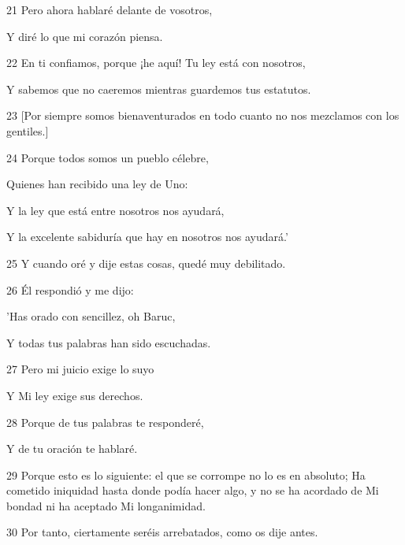\par 21 Pero ahora hablaré delante de vosotros,

\par Y diré lo que mi corazón piensa.

\par 22 En ti confiamos, porque ¡he aquí! Tu ley está con nosotros,

\par Y sabemos que no caeremos mientras guardemos tus estatutos.

\par 23 [Por siempre somos bienaventurados en todo cuanto no nos mezclamos con los gentiles.]

\par 24 Porque todos somos un pueblo célebre,

\par Quienes han recibido una ley de Uno:

\par Y la ley que está entre nosotros nos ayudará,

\par Y la excelente sabiduría que hay en nosotros nos ayudará.'

\par 25 Y cuando oré y dije estas cosas, quedé muy debilitado.

\par 26 Él respondió y me dijo:

\par 'Has orado con sencillez, oh Baruc,

\par Y todas tus palabras han sido escuchadas.

\par 27 Pero mi juicio exige lo suyo

\par Y Mi ley exige sus derechos.

\par 28 Porque de tus palabras te responderé,

\par Y de tu oración te hablaré.

\par 29 Porque esto es lo siguiente: el que se corrompe no lo es en absoluto; Ha cometido iniquidad hasta donde podía hacer algo, y no se ha acordado de Mi bondad ni ha aceptado Mi longanimidad.

\par 30 Por tanto, ciertamente seréis arrebatados, como os dije antes.

